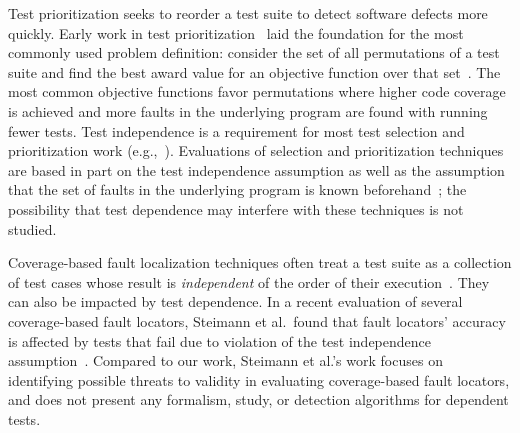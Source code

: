 Test prioritization seeks to reorder a test suite to detect
software defects more quickly. 
Early work in test
prioritization~\cite{Wong:1997:SER:851010.856115,Rothermel:1999:TCP:519621.853398}
laid the foundation for the most commonly used problem definition:
consider the set of all permutations of a test suite and find the best
award value for an objective function over that
set~\cite{Elbaum:2000:PTC:347324.348910}.  The most common objective
functions favor permutations where higher code coverage
is achieved and more faults in the underlying
program  are found with running fewer tests.
Test independence is
a requirement for most test selection and prioritization work (e.g.,~\cite[p.~1500]{Rummel:2005:TPR:1066677.1067016}).
Evaluations of selection and prioritization techniques
are based in part on the test independence
assumption as well as the assumption that the set of faults in the underlying
program is known beforehand~\cite[\emph{et alia}]{Rothermel:1999:TCP:519621.853398,Do:2010:ETC:1907658.1908088}; the possibility that test dependence may
interfere with these techniques is not studied.



Coverage-based fault localization techniques
often treat a test suite as a collection of test cases
whose result is \textit{independent} of the order of their
execution~\cite{Jones:2002:VTI}. They can also be impacted by test dependence.
In a recent evaluation of several coverage-based fault locators,
 Steimann et al.\ found that fault locators' accuracy is
 affected by tests that fail due to violation of the test
 independence assumption~\cite{Steimann:2013}. 
 Compared to our work, Steimann et al.'s
 work focuses on identifying possible threats to validity
 in evaluating coverage-based fault locators, and does
 not present any formalism, study, or detection algorithms
 for dependent tests.

